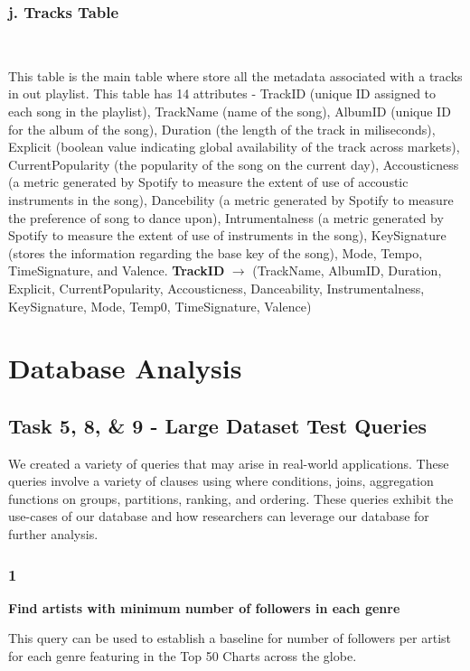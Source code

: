 \documentclass[conference]{IEEEtran}
\begin{document}
\subsubsection*{j. \textbf{Tracks} Table} \

This table is the main table where store all the metadata associated with a tracks in out playlist. This table has 14 attributes - TrackID (unique ID assigned to each song in the playlist), TrackName (name of the song), AlbumID (unique ID for the album of the song), Duration (the length of the track in miliseconds), Explicit (boolean value indicating global availability of the track across markets), CurrentPopularity (the popularity of the song on the current day), Accousticness (a metric generated by Spotify to measure the extent of use of accoustic instruments in the song), Dancebility (a metric generated by Spotify to measure the preference of song to dance upon), Intrumentalness (a metric generated by Spotify to measure the extent of use of instruments in the song), KeySignature (stores the information regarding the base key of the song), Mode, Tempo, TimeSignature, and Valence. \linebreak \linebreak
\textbf{TrackID} $\to$ (TrackName, AlbumID, Duration, Explicit, CurrentPopularity, Accousticness, Danceability, Instrumentalness, KeySignature, Mode, Temp0, TimeSignature, Valence)

\section{Database Analysis}

\subsection{\textbf{Task 5, 8, \& 9} - Large Dataset Test Queries}
We created a variety of queries that may arise in real-world applications. These queries involve a variety of clauses using where conditions, joins, aggregation functions on groups, partitions, ranking, and ordering. These queries exhibit the use-cases of our database and how researchers can leverage our database for further analysis. \ 

\subsubsection*{1} \textbf{Find artists with minimum number of followers in each genre}

This query can be used to establish a baseline for number of followers per artist for each genre featuring in the Top 50 Charts across the globe. \linebreak
\end{document}
